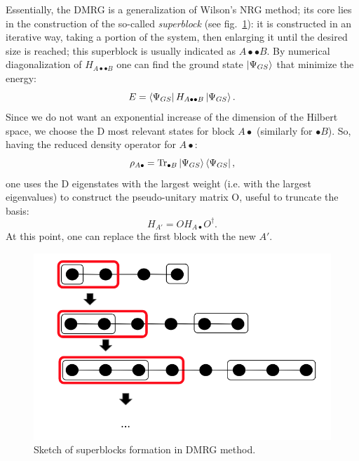 Essentially, the DMRG is a generalization of Wilson's NRG method; its core lies in the construction of the so-called \emph{superblock} (see fig.~\ref{fig:DMRG_superblockSketch}): it is constructed in an iterative way, taking a portion of the system, then enlarging it until the desired size is reached; this superblock is usually indicated as $A \bullet \bullet B$. By numerical diagonalization of $H_{A \bullet \bullet B}$ one can find the ground state $\ket{\Psi_{GS}}$ that minimize the energy:
\begin{equation*}
    E = \bra{\Psi_{GS}} H_{A \bullet \bullet B}\ket{\Psi_{GS}}.
\end{equation*}
Since we do not want an exponential increase of the dimension of the Hilbert space, we choose the D most relevant states for block $A \bullet$ (similarly for $\bullet B$). So, having the reduced density operator for $A \bullet$:
\begin{equation*}
    \rho_{A \bullet} = \operatorname{Tr}_{\bullet B} \ket{\Psi_{GS}}\bra{\Psi_{GS}},
\end{equation*}
one uses the D eigenstates with the largest weight (i.e. with the largest eigenvalues) to construct the pseudo-unitary matrix O, useful to truncate the basis:
\begin{equation*}
    H_{A'} = OH_{A\bullet}O^\dagger.
\end{equation*}
At this point, one can replace the first block with the new $A'$.

\begin{figure}[H]
    \centering
    \includegraphics[scale=0.5]{Figures/dmrg_superblock_sketch.png}
    \captionsetup{width=1.\linewidth}
    \caption{Sketch of superblocks formation in DMRG method.} %
    \label{fig:DMRG_superblockSketch}
\end{figure}


